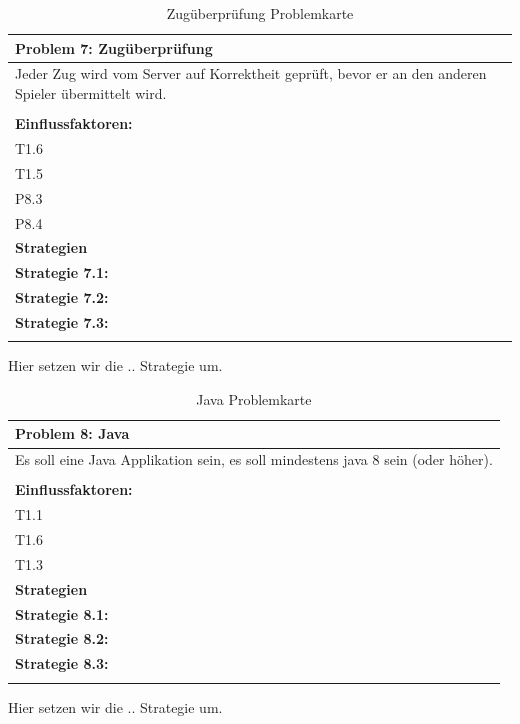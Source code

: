 \documentclass[fontsize=12pt,paper=a4,twoside]{scrartcl}
\begin{document}
\begin{table}[H]
    \centering
    \begin{tabular}{|p{15cm}|}
    \hline
          \textbf{Problem 7: Zugüberprüfung}  \\ \hline
	Jeder Zug wird vom Server auf Korrektheit geprüft, bevor er an den anderen Spieler übermittelt wird. \\
         \\ \hline
          \textbf{Einflussfaktoren: } \\
	T1.6 \\
	T1.5 \\
	P8.3 \\
	P8.4 \\
          \hline
          \textbf{Strategien} \\ \hline
            {}          
           \label{strategie:7.1}     
          \textbf{Strategie 7.1: }  \\        
  {}          
           \label{strategie:7.2}              
          \textbf{Strategie 7.2:}  \\
	 {}          
           \label{strategie:7.3}     
          \textbf{Strategie 7.3: }  \\ 
	 \\ \hline
    \end{tabular}

    \caption{Zugüberprüfung Problemkarte}
    \label{tab:ProblemKarte7}
\end{table}
Hier setzen wir die .. Strategie um. \\

\begin{table}[H]
    \centering
    \begin{tabular}{|p{15cm}|}
    \hline
          \textbf{Problem 8: Java}  \\ \hline
	Es soll eine Java Applikation sein, es soll mindestens java 8 sein (oder höher). \\
         \\ \hline
          \textbf{Einflussfaktoren: } \\
	T1.1 \\
	T1.6 \\
	T1.3 \\
          \hline
          \textbf{Strategien} \\ \hline
            {}          
           \label{strategie:8.1}     
          \textbf{Strategie 8.1:}  \\        
  {}          
           \label{strategie:8.2}              
          \textbf{Strategie 8.2:}  \\
	 {}          
           \label{strategie:8.3}     
          \textbf{Strategie 8.3: }  \\ 
	 \\ \hline
    \end{tabular}

    \caption{Java Problemkarte}
    \label{tab:ProblemKarte8}
\end{table}
Hier setzen wir die .. Strategie um. \\
\end{document}
